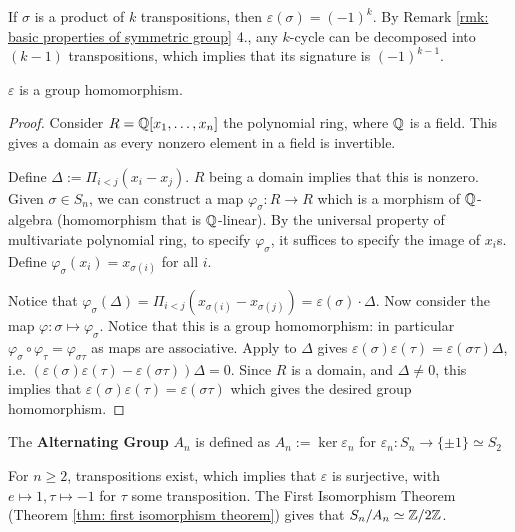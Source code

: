 \begin{example}
    If $\sigma$ is a product of $k$ transpositions, then $\varepsilon(\sigma)= (-1)^k$. By Remark \ref{rmk: basic properties of symmetric group} 4., any $k$-cycle can be decomposed into $(k-1)$ transpositions, which implies that its signature is $(-1)^{k-1}$.
\end{example}

\begin{proposition}
    $\varepsilon$ is a group homomorphism.
\end{proposition}

\begin{proof}
    Consider $R = \mathbb{Q}[x_1, \dots, x_n]$ the polynomial ring, where $\mathbb{Q}$ is a field. This gives a domain as every nonzero element in a field is invertible. 

    Define $\Delta := \Pi_{i < j} (x_i - x_j)$. $R$ being a domain implies that this is nonzero. Given $\sigma \in S_n$, we can construct a map $\varphi_{\sigma}: R \to R$ which is a morphism of $\mathbb{Q}$-algebra (homomorphism that is $\mathbb{Q}$-linear). By the universal property of multivariate polynomial ring, to specify $\varphi_{\sigma}$, it suffices to specify the image of $x_i$s. Define $\varphi_{\sigma}(x_i) = x_{\sigma(i)}$ for all $i$. 
    
    Notice that $\varphi_{\sigma}(\Delta) = \Pi_{i < j} (x_{\sigma(i)} - x_{\sigma(j)}) = \varepsilon(\sigma) \cdot \Delta$. Now consider the map $\varphi: \sigma \mapsto \varphi_{\sigma}$. Notice that this is a group homomorphism: in particular $\varphi_{\sigma} \circ \varphi_{\tau} = \varphi_{\sigma\tau}$ as maps are associative. Apply to $\Delta$ gives $\varepsilon(\sigma)\varepsilon(\tau) = \varepsilon(\sigma\tau) \Delta$, i.e. $(\varepsilon(\sigma) \varepsilon(\tau) - \varepsilon(\sigma\tau))\Delta = 0$. Since $R$ is a domain, and $\Delta \neq 0$, this implies that $\varepsilon(\sigma)\varepsilon(\tau) = \varepsilon(\sigma\tau)$ which gives the desired group homomorphism.
\end{proof}

\begin{definition}
    The \textbf{Alternating Group} $A_n$ is defined as $A_n := \ker \varepsilon_n$ for $\varepsilon_n : S_n \to \{\pm 1\} \simeq S_2$
\end{definition}

\begin{remark}
    For $n \geq 2$, transpositions exist, which implies that $\varepsilon$ is surjective, with $e \mapsto 1, \tau \mapsto -1$ for $\tau$ some transposition. The First Isomorphism Theorem (Theorem \ref{thm: first isomorphism theorem}) gives that $S_n / A_n \simeq \mathbb{Z}/2\mathbb{Z}$.
\end{remark}

